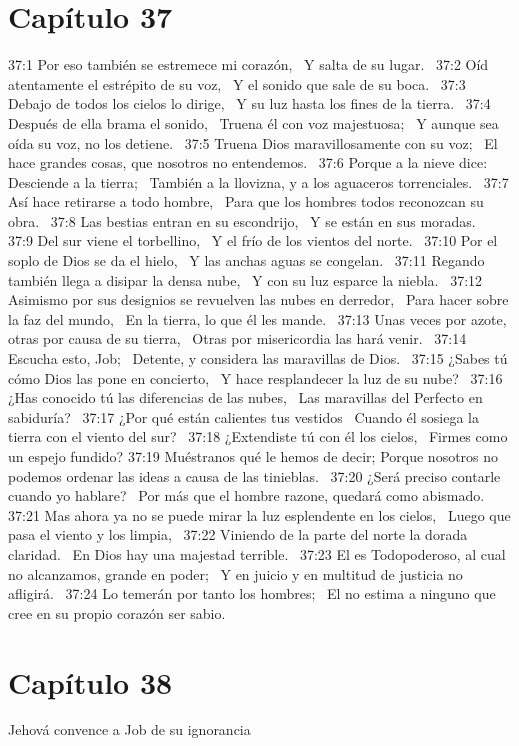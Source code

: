 \section*{Capítulo 37 }

37:1 Por eso también se estremece mi corazón,  
Y salta de su lugar.  
37:2 Oíd atentamente el estrépito de su voz,  
Y el sonido que sale de su boca.  
37:3 Debajo de todos los cielos lo dirige,  
Y su luz hasta los fines de la tierra.  
37:4 Después de ella brama el sonido,  
Truena él con voz majestuosa;  
Y aunque sea oída su voz, no los detiene.  
37:5 Truena Dios maravillosamente con su voz;  
El hace grandes cosas, que nosotros no entendemos.  
37:6 Porque a la nieve dice: Desciende a la tierra;  
También a la llovizna, y a los aguaceros torrenciales.  
37:7 Así hace retirarse a todo hombre,  
Para que los hombres todos reconozcan su obra.  
37:8 Las bestias entran en su escondrijo,  
Y se están en sus moradas.  
37:9 Del sur viene el torbellino,  
Y el frío de los vientos del norte.  
37:10 Por el soplo de Dios se da el hielo,  
Y las anchas aguas se congelan.  
37:11 Regando también llega a disipar la densa nube,  
Y con su luz esparce la niebla.  
37:12 Asimismo por sus designios se revuelven las nubes en derredor,  
Para hacer sobre la faz del mundo,  
En la tierra, lo que él les mande.  
37:13 Unas veces por azote, otras por causa de su tierra,  
Otras por misericordia las hará venir.  
37:14 Escucha esto, Job;  
Detente, y considera las maravillas de Dios.  
37:15 ¿Sabes tú cómo Dios las pone en concierto,  
Y hace resplandecer la luz de su nube?  
37:16 ¿Has conocido tú las diferencias de las nubes,  
Las maravillas del Perfecto en sabiduría?  
37:17 ¿Por qué están calientes tus vestidos  
Cuando él sosiega la tierra con el viento del sur?  
37:18 ¿Extendiste tú con él los cielos,  
Firmes como un espejo fundido? 
37:19 Muéstranos qué le hemos de decir; 
Porque nosotros no podemos ordenar las ideas a causa de las tinieblas.  
37:20 ¿Será preciso contarle cuando yo hablare?  
Por más que el hombre razone, quedará como abismado.  
37:21 Mas ahora ya no se puede mirar la luz esplendente en los cielos,  
Luego que pasa el viento y los limpia,  
37:22 Viniendo de la parte del norte la dorada claridad.  
En Dios hay una majestad terrible.  
37:23 El es Todopoderoso, al cual no alcanzamos, grande en poder;  
Y en juicio y en multitud de justicia no afligirá.  
37:24 Lo temerán por tanto los hombres;  
El no estima a ninguno que cree en su propio corazón ser sabio.  
\section*{Capítulo 38 }
Jehová convence a Job de su ignorancia  

